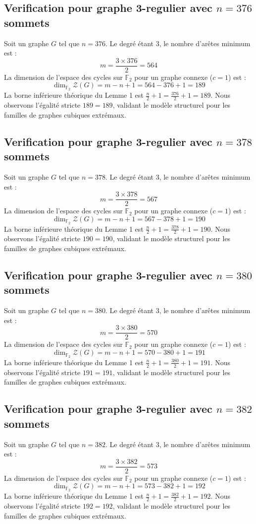 \documentclass[11pt,a4paper]{article}
\begin{document}
\subsection{Verification pour graphe 3-regulier avec $n=376$ sommets}
Soit un graphe $G$ tel que $n = 376$. Le degré étant 3, le nombre d'arêtes minimum est :
$$ m = \frac{3 \times 376}{2} = 564 $$
La dimension de l'espace des cycles sur $\mathbb{F}_2$ pour un graphe connexe ($c=1$) est :
$$ \dim_{\mathbb{F}_2} \mathcal{Z}(G) = m - n + 1 = 564 - 376 + 1 = 189 $$
La borne inférieure théorique du Lemme 1 est $\frac{n}{2} + 1 = \frac{376}{2} + 1 = 189$.
Nous observons l'égalité stricte $189 = 189$, validant le modèle structurel pour les familles de graphes cubiques extrémaux.

\subsection{Verification pour graphe 3-regulier avec $n=378$ sommets}
Soit un graphe $G$ tel que $n = 378$. Le degré étant 3, le nombre d'arêtes minimum est :
$$ m = \frac{3 \times 378}{2} = 567 $$
La dimension de l'espace des cycles sur $\mathbb{F}_2$ pour un graphe connexe ($c=1$) est :
$$ \dim_{\mathbb{F}_2} \mathcal{Z}(G) = m - n + 1 = 567 - 378 + 1 = 190 $$
La borne inférieure théorique du Lemme 1 est $\frac{n}{2} + 1 = \frac{378}{2} + 1 = 190$.
Nous observons l'égalité stricte $190 = 190$, validant le modèle structurel pour les familles de graphes cubiques extrémaux.

\subsection{Verification pour graphe 3-regulier avec $n=380$ sommets}
Soit un graphe $G$ tel que $n = 380$. Le degré étant 3, le nombre d'arêtes minimum est :
$$ m = \frac{3 \times 380}{2} = 570 $$
La dimension de l'espace des cycles sur $\mathbb{F}_2$ pour un graphe connexe ($c=1$) est :
$$ \dim_{\mathbb{F}_2} \mathcal{Z}(G) = m - n + 1 = 570 - 380 + 1 = 191 $$
La borne inférieure théorique du Lemme 1 est $\frac{n}{2} + 1 = \frac{380}{2} + 1 = 191$.
Nous observons l'égalité stricte $191 = 191$, validant le modèle structurel pour les familles de graphes cubiques extrémaux.

\subsection{Verification pour graphe 3-regulier avec $n=382$ sommets}
Soit un graphe $G$ tel que $n = 382$. Le degré étant 3, le nombre d'arêtes minimum est :
$$ m = \frac{3 \times 382}{2} = 573 $$
La dimension de l'espace des cycles sur $\mathbb{F}_2$ pour un graphe connexe ($c=1$) est :
$$ \dim_{\mathbb{F}_2} \mathcal{Z}(G) = m - n + 1 = 573 - 382 + 1 = 192 $$
La borne inférieure théorique du Lemme 1 est $\frac{n}{2} + 1 = \frac{382}{2} + 1 = 192$.
Nous observons l'égalité stricte $192 = 192$, validant le modèle structurel pour les familles de graphes cubiques extrémaux.
\end{document}
